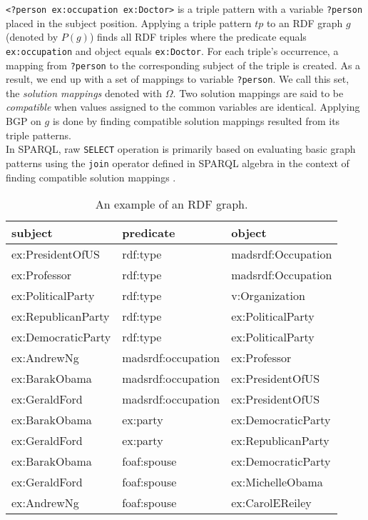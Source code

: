\verb|<?person ex:occupation ex:Doctor>| is a triple pattern with a variable \verb|?person| placed in the subject position. Applying a triple pattern $tp$ to an RDF graph $g$ (denoted by $P(g)$) finds all RDF triples where the predicate equals \verb|ex:occupation| and object equals \verb|ex:Doctor|. For each triple's occurrence, a mapping from \verb|?person| to the corresponding subject of the triple is created. As a result, we end up with a set of mappings to variable \verb|?person|. We call this set, the \textit{solution mappings} denoted with $\Omega$.  Two solution mappings are said to be \textit{compatible} when values assigned to the common variables are identical. Applying BGP on $g$ is done by finding compatible solution mappings resulted from its triple patterns. \\

In SPARQL, raw \verb|SELECT| operation is primarily based on evaluating basic graph patterns using the \verb|join| operator defined in SPARQL algebra in the context of finding compatible solution mappings \cite{Hitzler}.

\begin{table}[h]
	\centering
	\begin{tabular}{lll}
		\textbf{subject} & \textbf{predicate} & \textbf{object} \\ \hline
		ex:PresidentOfUS          &        rdf:type            &        madsrdf:Occupation       \\
		ex:Professor          &        rdf:type            &        madsrdf:Occupation       \\
		ex:PoliticalParty			&          rdf:type          &          v:Organization     \\
		ex:RepublicanParty			&          rdf:type          &          ex:PoliticalParty     \\
		ex:DemocraticParty			&          rdf:type          &          ex:PoliticalParty     \\
		ex:AndrewNg          &        madsrdf:occupation           &      ex:Professor         \\
		ex:BarakObama          &        madsrdf:occupation           &       ex:PresidentOfUS         \\
		ex:GeraldFord          &        madsrdf:occupation           &       ex:PresidentOfUS         \\
		ex:BarakObama          &        ex:party           &       ex:DemocraticParty	         \\
		ex:GeraldFord          &        ex:party           &       ex:RepublicanParty         \\
		ex:BarakObama          &        foaf:spouse           &       ex:DemocraticParty	         \\
		ex:GeraldFord          &        foaf:spouse           &       ex:MichelleObama         \\
		ex:AndrewNg          &        foaf:spouse           &       ex:CarolEReiley         \\
	\end{tabular}
	\caption{An example of an RDF graph.}
	\label{tab:rdf_graph_example}
\end{table}

